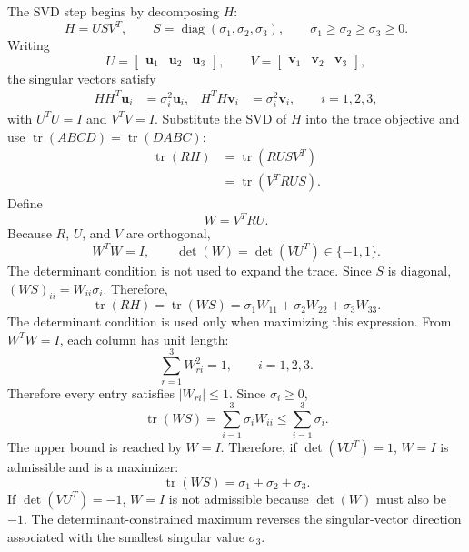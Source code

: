 \documentclass[11pt]{article}
\newcommand{\vct}[1]{\bm{#1}}
\newcommand{\diag}{\operatorname{diag}}
\newcommand{\tr}{\operatorname{tr}}
\begin{document}
The SVD step begins by decomposing $H$:
\begin{equation}
H=USV^T,\qquad
S=\diag(\sigma_1,\sigma_2,\sigma_3),\qquad
\sigma_1\geq\sigma_2\geq\sigma_3\geq0.
\end{equation}
Writing
\begin{equation}
U=\begin{bmatrix}\vct{u}_1&\vct{u}_2&\vct{u}_3\end{bmatrix},
\qquad
V=\begin{bmatrix}\vct{v}_1&\vct{v}_2&\vct{v}_3\end{bmatrix},
\end{equation}
the singular vectors satisfy
\begin{align}
HH^T\vct{u}_i&=\sigma_i^2\vct{u}_i,&
H^TH\vct{v}_i&=\sigma_i^2\vct{v}_i,
\qquad i=1,2,3,
\end{align}
with $U^TU=I$ and $V^TV=I$.
Substitute the SVD of $H$ into the trace objective and use
$\tr(ABCD)=\tr(DABC)$:
\begin{align}
\tr(RH)
&=\tr(RUSV^T)\\
&=\tr(V^TRUS).
\end{align}
Define
\begin{equation}
W=V^TRU.
\end{equation}
Because $R$, $U$, and $V$ are orthogonal,
\begin{equation}
W^TW=I,\qquad
\det(W)=\det(VU^T)\in\{-1,1\}.
\end{equation}
The determinant condition is not used to expand the trace. Since $S$ is diagonal, $(WS)_{ii}=W_{ii}\sigma_i$. Therefore,
\begin{equation}
\tr(RH)=\tr(WS)
=\sigma_1W_{11}+\sigma_2W_{22}+\sigma_3W_{33}.
\end{equation}
The determinant condition is used only when maximizing this expression. From $W^TW=I$, each column has unit length:
\begin{equation}
\sum_{r=1}^{3}W_{ri}^2=1,\qquad i=1,2,3.
\end{equation}
Therefore every entry satisfies $\lvert W_{ri}\rvert\leq1$. Since $\sigma_i\geq0$,
\begin{equation}
\tr(WS)
=\sum_{i=1}^{3}\sigma_iW_{ii}
\leq\sum_{i=1}^{3}\sigma_i.
\end{equation}
The upper bound is reached by $W=I$. Therefore, if
$\det(VU^T)=1$, $W=I$ is admissible and is a maximizer:
\begin{equation}
\tr(WS)=\sigma_1+\sigma_2+\sigma_3.
\end{equation}
If $\det(VU^T)=-1$, $W=I$ is not admissible because $\det(W)$ must also be $-1$. The determinant-constrained maximum reverses the singular-vector direction associated with the smallest singular value $\sigma_3$.
\end{document}
